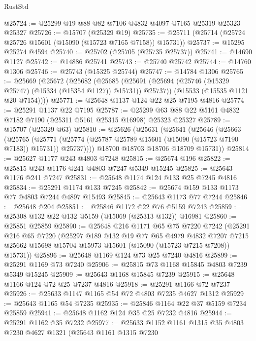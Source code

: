 \begin{lexlean}{RustStd}
\begin{coremodule}
@25724 := @25299 @19 @88 @82 @7106 @4832 @4097 @7165 @25319 @25323 @25327
@25726 := @15707 (@25329 @19)
@25735 := @25711 (@25714 (@25724 @25726 @15601 (@15090 (@15723 @7165 @7158)) @15731))
@25737 := @15295 @25274 @4594
@25740 := @25702 (@25705 (@25735 @25737))
@25741 := @14690 @1127
@25742 := @14886 @25741
@25743 := @25740 @25742
@25744 := @14760 @1306
@25746 := @25743 (@15325 @25744)
@25747 := @14784 @1306
@25765 := @25669
    (@25672
      (@25682
        (@25685 (@25691 (@25694 (@25746 (@15329 @25747) (@15334 (@15354 @1127)) @15731)) @25737))
        (@15533 (@15535 @1121 @20 @7154))))
@25771 := @25648 @1137 @124 @22 @25 @7195 @4816
@25774 := @25291 @1137 @22 @7195
@25787 := @25299 @63 @88 @22 @5161 @4832 @7182 @7190 (@25311 @5161 @25315 @16998) @25323 @25327
@25789 := @15707 (@25329 @63)
@25810 := @25626
    (@25631
      (@25641
        (@25646
          (@25663
            (@25765
              (@25771
                (@25774 (@25787 @25789 @15601 (@15090 (@15723 @7190 @7183)) @15731))
                @25737))))
        @18700
        @18703
        @18706
        @18709
        @15731))
@25814 := @25627 @1177 @243 @4803 @7248
@25815 := @25674 @196
@25822 := @25815 @243 @1176 @241 @4803 @7247 @5349 @15245
@25825 := @25643 @1176 @241 @7247
@25831 := @25648 @1174 @124 @133 @25 @7245 @4816
@25834 := @25291 @1174 @133 @7245
@25842 := @25674 @159 @133 @1173 @77 @4803 @7244 @4897 @15493
@25845 := @25643 @1173 @77 @7244
@25846 := @25648 @204
@25851 := @25846 @1172 @22 @76 @5159 @7243
@25859 := @25308 @132 @22 @132 @5159 (@15069 (@25313 @132)) @16981
@25860 := @25851 @25859
@25890 := @25648
    @216
    @1171
    @65
    @75
    @7220
    @7242
    (@25291
      @216
      @65
      @7220
      (@25297
        @189
        @132
        @19
        @77
        @65
        @4979
        @4832
        @7207
        @7215
        @25662
        @15698
        @15704
        @15973
        @15601
        (@15090 (@15723 @7215 @7208))
        @15731))
@25896 := @25648 @1169 @124 @73 @25 @7240 @4816
@25899 := @25291 @1169 @73 @7240
@25906 := @25815 @73 @1168 @15845 @4803 @7239 @5349 @15245
@25909 := @25643 @1168 @15845 @7239
@25915 := @25648 @1166 @124 @72 @25 @7237 @4816
@25918 := @25291 @1166 @72 @7237
@25926 := @25633 @1147 @1165 @54 @72 @4803 @7235 @4627 @1312
@25929 := @25643 @1165 @54 @7235
@25935 := @25846 @1164 @22 @37 @5159 @7234 @25859
@25941 := @25648 @1162 @124 @35 @25 @7232 @4816
@25944 := @25291 @1162 @35 @7232
@25977 := @25633
    @1152
    @1161
    @1315
    @35
    @4803
    @7230
    @4627
    @1321
    (@25643
      @1161
      @1315
      @7230

\end{coremodule}
\end{lexlean}
